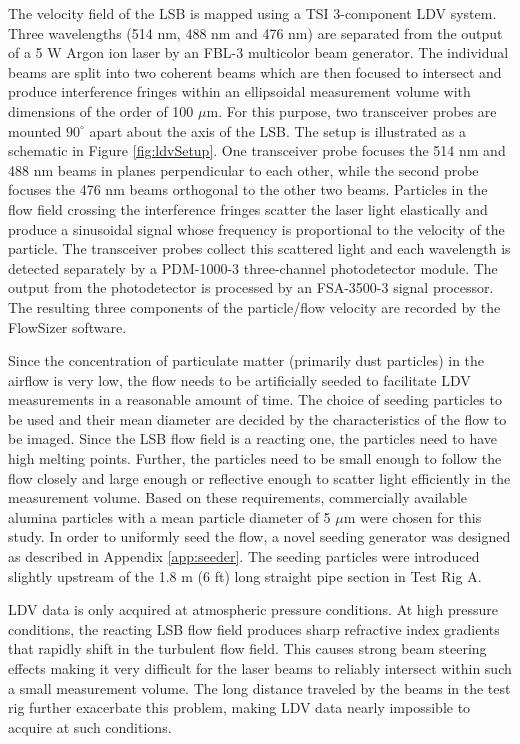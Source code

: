 The velocity field of the LSB is mapped using a TSI 3-component LDV system.
Three wavelengths (514 nm, 488 nm and 476 nm) are separated from the output of a 5 W Argon ion laser by an FBL-3 multicolor beam generator.
The individual beams are split into two coherent beams which are then focused to intersect and produce interference fringes within an ellipsoidal measurement volume with dimensions of the order of 100 \(\mu\)m.
For this purpose, two transceiver probes are mounted \(90^\circ\) apart about the axis of the LSB.
The setup is illustrated as a schematic in Figure \ref{fig:ldvSetup}.
One transceiver probe focuses the 514 nm and 488 nm beams in planes perpendicular to each other, while the second probe focuses the 476 nm beams orthogonal to the other two beams.
Particles in the flow field crossing the interference fringes scatter the laser light elastically and produce a sinusoidal signal whose frequency is proportional to the velocity of the particle.
The transceiver probes collect this scattered light and each wavelength is detected separately by a PDM-1000-3 three-channel photodetector module.
The output from the photodetector is processed by an FSA-3500-3 signal processor.
The resulting three components of the particle/flow velocity are recorded by the FlowSizer software.

Since the concentration of particulate matter (primarily dust particles) in the airflow is very low, the flow needs to be artificially seeded to facilitate LDV measurements in a reasonable amount of time.
The choice of seeding particles to be used and their mean diameter are decided by the characteristics of the flow to be imaged.\cite{1997-melling}
Since the LSB flow field is a reacting one, the particles need to have high melting points.
Further, the particles need to be small enough to follow the flow closely and large enough or reflective enough to scatter light efficiently in the measurement volume.
Based on these requirements, commercially available alumina particles with a mean particle diameter of 5 \(\mu\)m were chosen for this study.
In order to uniformly seed the flow, a novel seeding generator was designed as described in Appendix \ref{app:seeder}.
The seeding particles were introduced slightly upstream of the 1.8 m (6 ft) long straight pipe section in Test Rig A.

LDV data is only acquired at atmospheric pressure conditions.
At high pressure conditions, the reacting LSB flow field produces sharp refractive index gradients that rapidly shift in the turbulent flow field.
This causes strong beam steering effects making it very difficult for the laser beams to reliably intersect within such a small measurement volume.\cite{1997-hemmerling}
The long distance traveled by the beams in the test rig further exacerbate this problem, making LDV data nearly impossible to acquire at such conditions.

